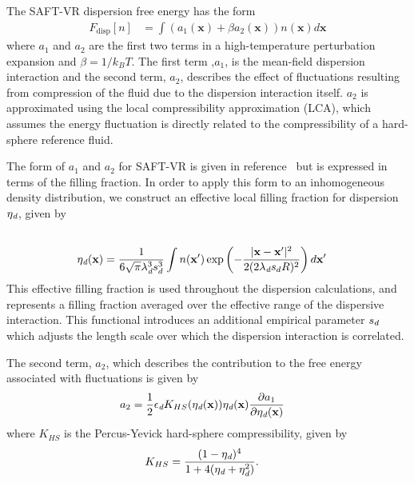 \documentclass[letterpaper,twocolumn,amsmath,amssymb,prb]{revtex4-1}
\newcommand{\xx}{\textbf{x}}
\begin{document}
The SAFT-VR dispersion free energy has the form~\cite{gil-villegas-1997-SAFT-VR}
\begin{align}
  F_\text{disp}[n] &= \int \left(a_1(\xx) + \beta a_2(\xx)\right)n(\xx)d\xx
\end{align}
where $a_1$ and $a_2$ are the first two terms in a high-temperature
perturbation expansion and $\beta=1/k_BT$.  The first term ,$a_1$, is 
the mean-field dispersion interaction and the second term, $a_2$, describes the
effect of fluctuations resulting from compression of the fluid due
to the dispersion interaction itself. $a_2$ is approximated
using the local compressibility approximation (LCA), which
assumes the energy fluctuation is directly related to the
compressibility of a hard-sphere reference fluid\cite{barker1976liquid}.

The form of $a_1$ and $a_2$ for SAFT-VR is given in
reference~\cite{gil-villegas-1997-SAFT-VR} but is expressed in terms
of the filling fraction.  In order to apply this form to an
inhomogeneous density distribution, we construct an effective local
filling fraction for dispersion $\eta_\textit{d}$, given by
\begin{align}
  \\
  \etadisp(\xx) &= \frac{1}{6\sqrt{\pi} \lambdadisp^3\lscale^3}
  \int n(\xx')\exp\left({-\frac{|\xx-\xx'|^2}{2(2 \lambdadisp
      \lscale R)^2}}\right)d\xx'
\end{align}
This effective filling fraction is used throughout the dispersion
calculations, and represents a filling fraction averaged over the
effective range of the dispersive interaction.  This functional
introduces an additional empirical parameter $s_d$ which adjusts
the length scale over which the dispersion interaction is correlated.

The second term, $a_2$, which describes the contribution to the free
energy associated with fluctuations is given by
\begin{align}
  a_2 &= \frac12 \epsilondisp
              K_{HS}(\etadisp(\xx)) \etadisp(\xx)
              \frac{\partial a_1}{\partial \etadisp(\xx)}
\end{align}
where $K_{HS}$ is the Percus-Yevick hard-sphere compressibility, given
by
\begin{align}
  K_{HS} &=
    \frac{(1 - \eta_\textit{d})^4}{1 + 4(\eta_\textit{d} + \eta_\textit{d}^2)}.
\end{align}
\end{document}
